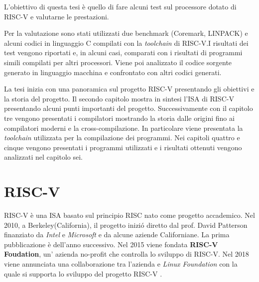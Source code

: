 \documentclass[12pt, a4paper]{report}
\begin{document}
L'obiettivo di questa tesi è quello di fare alcuni test sul processore dotato di RISC-V e valutarne le prestazioni.

Per la valutazione sono stati utilizzati due benchmark (Coremark, LINPACK) e alcuni
codici in linguaggio C compilati con la \textit{toolchain} di RISC-V.I risultati dei test vengono riportati e, in alcuni casi, comparati con i risultati di programmi simili compilati per altri processori. Viene poi analizzato il codice sorgente generato in linguaggio macchina e confrontato con altri codici generati.

La tesi inizia con una panoramica sul progetto RISC-V presentando gli obiettivi e la storia del progetto. Il secondo capitolo mostra in sintesi l'ISA di RISC-V presentando alcuni punti importanti del progetto. Successivamente con il capitolo tre vengono presentati i compilatori mostrando la storia dalle origini fino ai compilatori moderni e la cross-compilazione. In particolare viene presentata la \textit{toolchain} utilizzata per la compilazione dei programmi.
Nei capitoli quattro e cinque vengono presentati i programmi utilizzati e i risultati ottenuti vengono analizzati nel capitolo sei.


\chapter{RISC-V}
RISC-V è una ISA basato sul principio RISC nato come progetto accademico. Nel 2010, a Berkeley(California), il progetto inizi\'o diretto dal prof. David Patterson finanziato da \textit{Intel } e \textit{Microsoft} e da alcune aziende Californiane. La prima pubblicazione è dell'anno successivo. Nel 2015 viene fondata \textbf{RISC-V Foudation}, un' azienda no-profit che controlla lo sviluppo di RISC-V. Nel 2018 viene annunciata una collaborazione tra l'azienda e \textit{Linux Foundation} con la quale si supporta lo sviluppo del progetto RISC-V \cite{RISCOrgHistory}.
\end{document}
